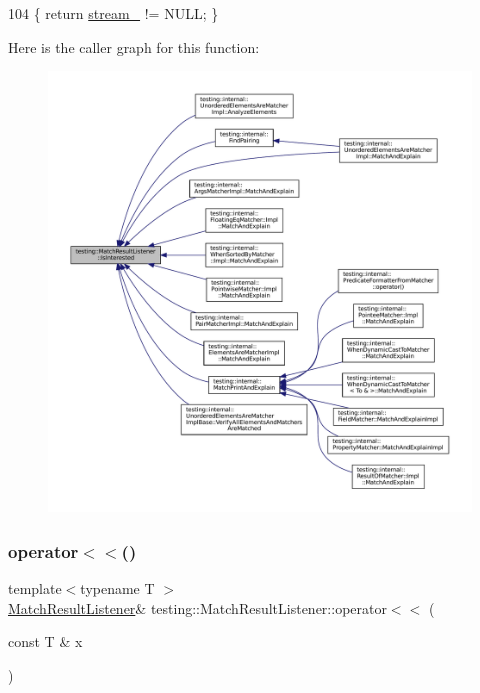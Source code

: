 \begin{DoxyCode}
104 \{ \textcolor{keywordflow}{return} \hyperlink{classtesting_1_1MatchResultListener_a91ff831a7e848af58d44eb3b1801812c}{stream\_} != NULL; \}
\end{DoxyCode}
Here is the caller graph for this function\+:
\nopagebreak
\begin{figure}[H]
\begin{center}
\leavevmode
\includegraphics[width=350pt]{classtesting_1_1MatchResultListener_ac34f9771f2ba6128cd6a1348b3aebda3_icgraph}
\end{center}
\end{figure}
\mbox{\label{classtesting_1_1MatchResultListener_a89f628a452635d1502a9062d9c864ebd}} 
\subsubsection{\texorpdfstring{operator$<$$<$()}{operator<<()}}
{\footnotesize\ttfamily template$<$typename T $>$ \\
\hyperlink{classtesting_1_1MatchResultListener}{Match\+Result\+Listener}\& testing\+::\+Match\+Result\+Listener\+::operator$<$$<$ (\begin{DoxyParamCaption}\item[{const T \&}]{x }\end{DoxyParamCaption})\hspace{0.3cm}{\ttfamily [inline]}}



